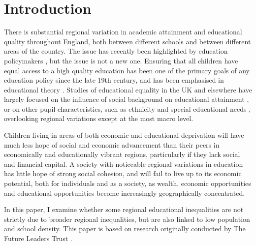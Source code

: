 \documentclass[12pt, a4paper]{article}
\begin{document}
\section{Introduction}

There is substantial regional variation in academic attainment and educational quality throughout England, both between different schools and between different areas of the country. The issue has recently been highlighted by education policymakers \autocites[for example see][]{departmentforeducation2016b,departmentforeducation2016c, wilshaw2015}, but the issue is not a new one. Ensuring that all children have equal access to a high quality education has been one of the primary goals of any education policy since the late 19th century, and has been emphasised in educational theory \autocites[for example see][]{coleman1968, dewey1916}. Studies of educational equality in the UK and elsewhere have largely focused on the influence of social background on educational attainment \autocites[see][]{breen2005}, or on other pupil characteristics, such as ethnicity and special educational needs \autocites[for example see][]{perera2016, strand2015a}, overlooking regional variations except at the most macro level. 

Children living in areas of both economic and educational deprivation will have much less hope of social and economic advancement than their peers in economically and educationally vibrant regions, particularly if they lack social and financial capital. A society with noticeable regional variations in education has little hope of strong social cohesion, and will fail to live up to its economic potential, both for individuals and as a society, as wealth, economic opportunities and educational opportunities become increasingly geographically concentrated.

In this paper, I examine whether some regional educational inequalities are not strictly due to broader regional inequalities, but are also linked to low population and school density. This paper is based on research originally conducted by The Future Leaders Trust \autocites{theobald2015}.
\end{document}
